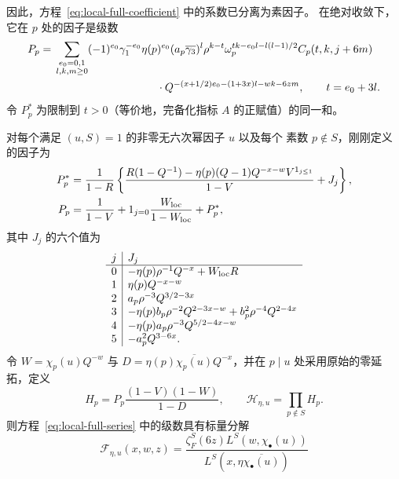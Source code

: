 因此，方程~\eqref{eq:local-full-coefficient} 中的系数已分离为素因子。
在绝对收敛下，它在 $p$ 处的因子是级数
\begin{equation}\label{eq:local-P}
\begin{aligned}
 P_p={}&\sum_{\substack{e_0=0,1\\l,k,m\ge0}}
 (-1)^{e_0}\gamma_1^{-e_0}\eta(p)^{e_0}
 (a_p\overline{\gamma_3})^l\rho^{k-t}
 \omega_p^{tk-e_0l-l(l-1)/2}C_p(t,k,j+6m)\\
 &\hspace{33mm}\cdot
 Q^{-(x+1/2)e_0-(1+3x)l-wk-6zm},\qquad t=e_0+3l.
\end{aligned}
\end{equation}
令 $P_p^*$ 为限制到 $t>0$（等价地，完备化指标 $A$ 的正赋值）的同一和。

\begin{lemma}[完备局部恒等式]\label{lem:local-euler}
对每个满足 $(u,S)=1$ 的非零无六次幂因子 $u$ 以及每个
素数 $p\notin S$，刚刚定义的因子为
\begin{equation}\label{old-eq:5.13a}
\begin{aligned}
 P_p^*&=\frac1{1-R}\left\{
 \frac{R(1-Q^{-1})-\eta(p)(Q-1)
 Q^{-x-w}V^{1_{j\le1}}}{1-V}+J_j\right\},\\
 P_p&=\frac1{1-V}+1_{j=0}\frac{W_{\rm loc}}{1-W_{\rm loc}}+P_p^*,
\end{aligned}
\end{equation}
其中 $J_j$ 的六个值为
\[
\begin{array}{c|l}
 j&J_j\\\hline
 0&-\eta(p)\rho^{-1}Q^{-x}+W_{\rm loc}R\\
 1&\eta(p)Q^{-x-w}\\
 2&a_p\rho^{-3}Q^{3/2-3x}\\
 3&-\eta(p)b_p\rho^{-2}Q^{2-3x-w}
       +b_p^2\rho^{-4}Q^{2-4x}\\
 4&-\eta(p)a_p\rho^{-3}Q^{5/2-4x-w}\\
 5&-a_p^2Q^{3-6x}.
\end{array}
\]
令 $W=\chi_p(u)Q^{-w}$ 与
$D=\eta(p)\overline{\chi_p(u)}Q^{-x}$，并在 $p\mid u$
处采用原始的零延拓，定义
\begin{equation}\label{eq:local-H-definition}
 H_p=P_p\frac{(1-V)(1-W)}{1-D},\qquad
 \mathcal H_{\eta,u}=\prod_{p\notin S}H_p.
\end{equation}
则方程~\eqref{eq:local-full-series} 中的级数具有标量分解
\begin{equation}\label{eq:probe-high}
 \mathcal F_{\eta,u}(x,w,z)=
 \frac{\zeta_F^S(6z)L^S(w,\chi_\bullet(u))}
 {L^S(x,\eta\overline{\chi_\bullet(u)})}

\end{equation}
\end{lemma}
